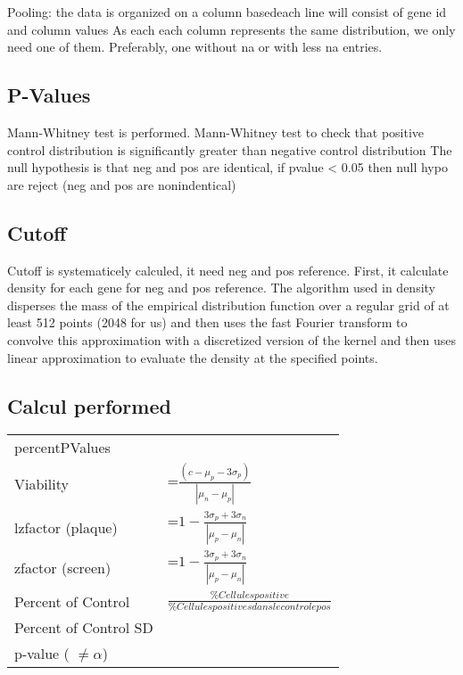 \documentclass[a4paper,10pt]{article}
\begin{document}
Pooling: the data is organized on a column basedeach line will consist of gene id and column values As each each column
represents the same distribution, we only need one of them. Preferably, one without na or with less na entries.



\subsection*{P-Values}
Mann-Whitney test is performed.
Mann-Whitney test to check that positive control distribution is significantly greater than negative control distribution
The null hypothesis is that neg and pos are identical, if pvalue < 0.05 then null hypo are reject (neg and pos are nonindentical)

\subsection*{Cutoff}
Cutoff is systematicely calculed, it need neg and pos reference.
First, it calculate density for each gene for neg and pos reference. The algorithm used in density disperses the mass of the
empirical distribution function over a regular grid of at least 512 points (2048 for us) and then uses the fast Fourier 
transform to convolve this approximation with a discretized version of the kernel and then uses linear approximation to evaluate
the density at the specified points. 


\subsection*{Calcul performed}

\begin{tabular}{|l|l|}
\hline

percentPValues &   \\
Viability & =$\frac{(c-\mu_p-3\sigma_p)}{|\mu_n-\mu_p|}$ \\
lzfactor (plaque) & =$1-\frac{3\sigma_p+3\sigma_n}{|\mu_p-\mu_n|}$ \\
zfactor (screen) &  =$1-\frac{3\sigma_p+3\sigma_n}{|\mu_p-\mu_n|}$\\
Percent of Control & $\frac{\% Cellules positive}{\% Cellules positives dans le controle pos}$  \\
Percent of Control SD &   \\
p-value ( $\neq \alpha$) &     \\

\hline
\end{tabular}
\end{document}
